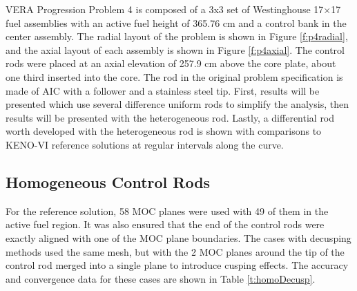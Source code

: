 VERA Progression Problem 4 is composed of a 3x3 set of Westinghouse 17$\times$17 fuel assemblies with an active fuel height of 365.76 cm and a control bank in the center assembly.  The radial layout of the problem is shown in Figure \ref{f:p4radial}, and the axial layout of each assembly is shown in Figure \ref{f:p4axial}.  The control rods were placed at an axial elevation of 257.9 cm above the core plate, about one third inserted into the core.  The rod in the original problem specification is made of AIC with a \bfc{} follower and a stainless steel tip.  First, results will be presented which use several difference uniform rods to simplify the analysis, then results will be presented with the heterogeneous rod.  Lastly, a differential rod worth developed with the heterogeneous rod is shown with comparisons to KENO-VI reference solutions at regular intervals along the curve.

\subsection{Homogeneous Control Rods}

For the reference solution, 58 MOC planes were used with 49 of them in the active fuel region.  It was also ensured that the end of the control rods were exactly aligned with one of the MOC plane boundaries.  The cases with decusping methods used the same mesh, but with the 2 MOC planes around the tip of the control rod merged into a single plane to introduce cusping effects.  The accuracy and convergence data for these cases are shown in Table \ref{t:homoDecusp}.

